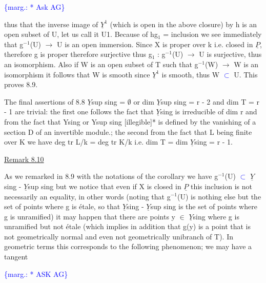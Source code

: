 \documentclass[11pt]{article}
\newcommand{\scanpage}[1]{\par\bigskip\noindent{\small\sffamily[scan #1]}\par}
\newcommand{\mspage}[1]{{\small\sffamily[p.\,#1]}}
\newcommand{\hand}[1]{\textcolor{blue}{#1}}
\newcommand{\margin}[1]{\textcolor{blue}{\{\textsf{marg.:} #1\}}}
\newcommand{\uline}[1]{\underline{#1}}
\begin{document}
\margin{* Ask AG}

\clearpage
\scanpage{24/51}
\mspage{51}

thus that the inverse image of $\underline{Y}^{1}$ (which is open in the above
closure) by h is an open subset of U, let us call it U1.  Because
of hg$_{1}$ = inclusion we see immediately that g$^{-1}$(U) $\to$ U is an open
immersion.  Since X is proper over k i.e. closed in $\underline{P}$, therefore g
is proper therefore surjective thus g$_{1}$ : g$^{-1}$(U) $\to$ U is
surjective, thus an isomorphism.  Also if W is an open subset of T
such that g$^{-1}$(W) $\to$ W is an isomorphism it follows that W is smooth
since $\underline{Y}^{1}$ is smooth, thus W \hand{$\subset$} U.  This proves 8.9.

The final assertions of 8.8 $\underline{Y}$sup sing = $\emptyset$ or dim $\underline{Y}$sup sing =
r - 2 and dim T = r - 1 are trivial:  the first one follows the
fact that $\underline{Y}$sing is irreducible of dim r and from the fact that Ysing
or Ysup sing [illegible]* is defined by the vanishing of a section D
of an invertible module.; the second from the fact that L being
finite over K we have deg tr L/k = deg tr K/k i.e. dim T = dim
$\underline{Y}$sing = r - 1.

\uline{Remark 8.10}

As we remarked in 8.9 with the notations of the corollary we
have g$^{-1}$(U) \hand{$\subset$} $\underline{Y}$sing - $\underline{Y}$sup sing but we notice that even if X is
closed in $\underline{P}$ this inclusion is not necessarily an equality, in
other words (noting that g$^{-1}$(U) is nothing else but the set of
points where g is étale, so that $\underline{Y}$sing - $\underline{Y}$sup sing is the set of
points where g is unramified) it may happen that there are points
y $\in$ $\underline{Y}$sing where g is unramified but not étale (which implies in
addition that g(y) is a point that is not geometrically normal and
even not geometrically unibranch of T).  In geometric terms this
corresponds to the following phenomenon; we may have a tangent

\margin{* ASK AG}

\clearpage
\scanpage{24/52}
\mspage{52}
\end{document}
